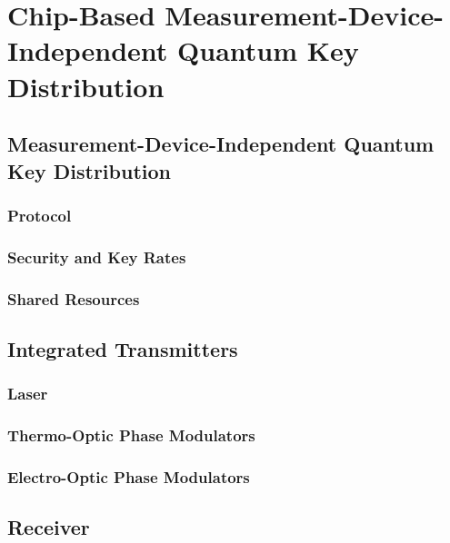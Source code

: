 %
%
\acresetall
\graphicspath{{./chapters/chapter04/fig04/}}

\let\textcircled=\pgftextcircled
\chapter{Chip-Based Measurement-Device-Independent Quantum Key Distribution}
\label{chap:mdiqkd}

\section{Measurement-Device-Independent Quantum Key Distribution}
\label{sec:mdi-qkd}

\subsection{Protocol}

\subsection{Security and Key Rates}

\subsection{Shared Resources}

\section{Integrated Transmitters}

\subsection{Laser}

\subsection{Thermo-Optic Phase Modulators}

\subsection{Electro-Optic Phase Modulators}

\section{Receiver}

